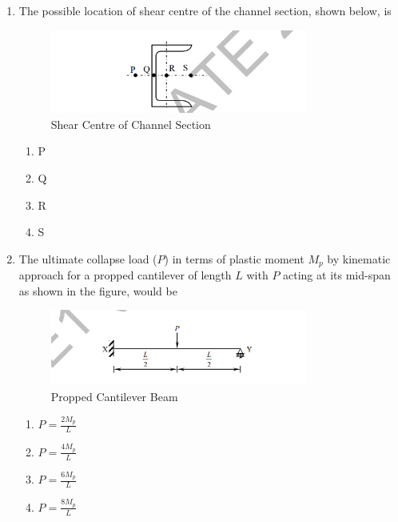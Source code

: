 \documentclass[journal,12pt,onecolumn]{IEEEtran}
\theoremstyle{remark}
\begin{document}
\begin{enumerate}
\item The possible location of shear centre of the channel section, shown below, is \hfill{}

\begin{figure}[H]
    \centering
    \includegraphics[width=0.8\textwidth]{figs/image3.png}
    \caption{Shear Centre of Channel Section}
    \label{fig:shear-centre}
\end{figure}

\begin{multicols}{2}
\begin{enumerate}
\item P
\item Q
\item R
\item S
\end{enumerate}
\end{multicols}

\item The ultimate collapse load ($P$) in terms of plastic moment $M_p$ by kinematic approach for a propped cantilever of length $L$ with $P$ acting at its mid-span as shown in the figure, would be \hfill{}

\begin{figure}[H]
    \centering
    \includegraphics[width=0.8\textwidth]{figs/image4.png}
    \caption{Propped Cantilever Beam}
    \label{fig:propped-cantilever}
\end{figure}

\begin{multicols}{2}
\begin{enumerate}
\item $P = \frac{2M_p}{L}$
\item $P = \frac{4M_p}{L}$
\item $P = \frac{6M_p}{L}$
\item $P = \frac{8M_p}{L}$
\end{enumerate}
\end{multicols}


\end{enumerate}
\end{document}
